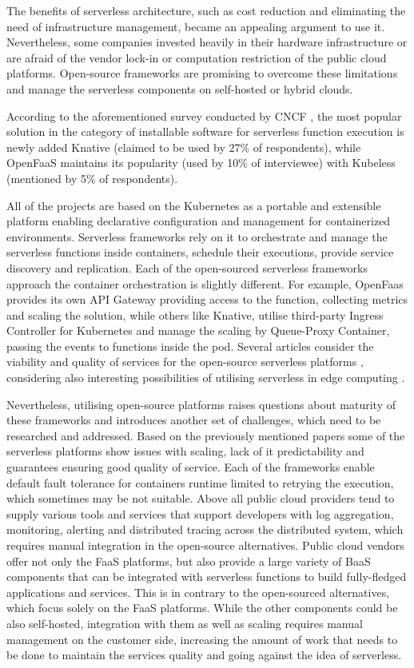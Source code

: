 The benefits of serverless architecture, such as cost reduction and eliminating the need of infrastructure management, became an appealing argument to use it. Nevertheless, some companies invested heavily in their hardware infrastructure or are afraid of the vendor lock-in or computation restriction of the public cloud platforms. Open-source frameworks are promising to overcome these limitations and manage the serverless components on self-hosted or hybrid clouds.

According to the aforementioned survey conducted by CNCF \cite{CNCFServerlessSurvey2020}, the most popular solution in the category of installable software for serverless function execution is newly added Knative (claimed to be used by 27\% of respondents), while OpenFaaS maintains its popularity (used by 10\% of interviewee) with Kubeless (mentioned by 5\% of respondents).

All of the projects are based on the Kubernetes as a portable and extensible platform enabling declarative configuration and management for containerized environments. Serverless frameworks rely on it to orchestrate and manage the serverless functions inside containers, schedule their executions, provide service discovery and replication. Each of the open-sourced serverless frameworks approach the container orchestration is slightly different. For example, OpenFaas provides its own API Gateway providing access to the function, collecting metrics and scaling the solution, while others like Knative, utilise third-party Ingress Controller for Kubernetes and manage the scaling by Queue-Proxy Container, passing the events to functions inside the pod. Several articles consider the viability and quality of services for the open-source serverless platforms \cite{OpenSourceServelessPerformance}, considering also interesting possibilities of utilising serverless in edge computing \cite{OpenSourceServelessEdge}.

Nevertheless, utilising open-source platforms raises questions about maturity of these frameworks and introduces another set of challenges, which need to be researched and addressed. Based on the previously mentioned papers some of the serverless platforms show issues with scaling, lack of it predictability and guarantees ensuring good quality of service. Each of the frameworks enable default fault tolerance for containers runtime limited to retrying the execution, which sometimes may be not suitable. Above all public cloud providers tend to supply various tools and services that support developers with log aggregation, monitoring, alerting and distributed tracing across the distributed system, which requires manual integration in the open-source alternatives. Public cloud vendors offer not only the FaaS platforms, but also provide a large variety of BaaS components that can be integrated with serverless functions to build fully-fledged applications and services. This is in contrary to the open-sourced alternatives, which focus solely on the FaaS platforms. While the other components could be also self-hosted, integration with them as well as scaling requires manual management on the customer side, increasing the amount of work that needs to be done to maintain the services quality and going against the idea of serverless.

